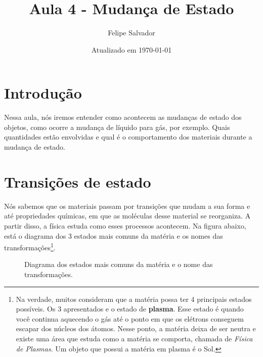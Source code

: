 \documentclass[12pt]{extarticle}
\title{Aula 4 - Mudança de Estado}
\author{Felipe Salvador}
\date{Atualizado em \today}
\newcommand{\<}{\langle}
\renewcommand{\>}{\rangle}
\theoremstyle{definition}
\begin{document}
\maketitle

\section{Introdução}

Nessa aula, nós iremos entender como acontecem as mudanças de estado dos objetos, como ocorre a mudança de líquido para gás, por exemplo. Quais quantidades estão envolvidas e qual é o comportamento dos materiais durante a mudança de estado.

\section{Transições de estado}

Nós sabemos que os materiais passam por transições que mudam a sua forma e até propriedades químicas, em que as moléculas desse material se reorganiza. A partir disso, a física estuda como esses processos acontecem. Na figura abaixo, está o diagrama dos 3 estados mais comuns da matéria e os nomes das transformações\footnote{Na verdade, muitos consideram que a matéria possa ter 4 principais estados possíveis. Os 3 apresentados e o estado de \textbf{plasma}. Esse estado é quando você continua aquecendo o gás até o ponto em que os elétrons conseguem escapar dos núcleos dos átomos. Nesse ponto, a matéria deixa de ser neutra e existe uma área que estuda como a matéria se comporta, chamada de \textit{Física de Plasmas}. Um objeto que possui a matéria em plasma é o Sol.}. 
\begin{figure}[h]
    \centering
{}
\label{fig:phases}
\caption{Diagrama dos estados mais comuns da matéria e o nome das transformações.}
\end{figure}
\end{document}
